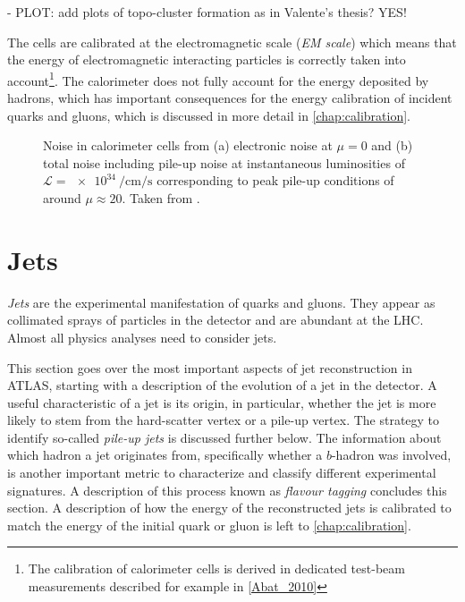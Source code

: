 - PLOT: add plots of topo-cluster formation as in Valente's thesis? YES!

The cells are calibrated at the electromagnetic scale (\emph{EM scale}) which means that the energy of electromagnetic interacting particles is correctly taken into account\footnote{The calibration of calorimeter cells is derived in dedicated test-beam measurements described for example in \cref{Abat_2010}}. The calorimeter does not fully account for the energy deposited by hadrons, which has important consequences for the energy calibration of incident quarks and gluons, which is discussed in more detail in \cref{chap:calibration}.


\begin{figure}
        
\caption{Noise in calorimeter cells from (a) electronic noise at $\mu=0$ and (b) total noise including pile-up noise at instantaneous luminosities of $\mathcal{L} = \SI{e34}{\per\cm\per\s}$ corresponding to peak pile-up conditions of around $\mu\approx20$. Taken from .}
\end{figure}


\section{Jets}
\emph{Jets} are the experimental manifestation of quarks and gluons.
They appear as collimated sprays of particles in the detector and are abundant at the LHC. 
Almost all physics analyses need to consider jets.

This section goes over the most important aspects of jet reconstruction in ATLAS, starting with a description of the evolution of a jet in the detector. 
A useful characteristic of a jet is its origin, in particular, whether the jet is more likely to stem from the hard-scatter vertex or a pile-up vertex. The strategy to identify so-called \emph{pile-up jets} is discussed further below.
The information about which hadron a jet originates from, specifically whether a $b$-hadron was involved, is another important metric to characterize and classify different experimental signatures. A description of this process known as \emph{flavour tagging} concludes this section.
A description of how the energy of the reconstructed jets is calibrated to match the energy of the initial quark or gluon is left to \cref{chap:calibration}. 

